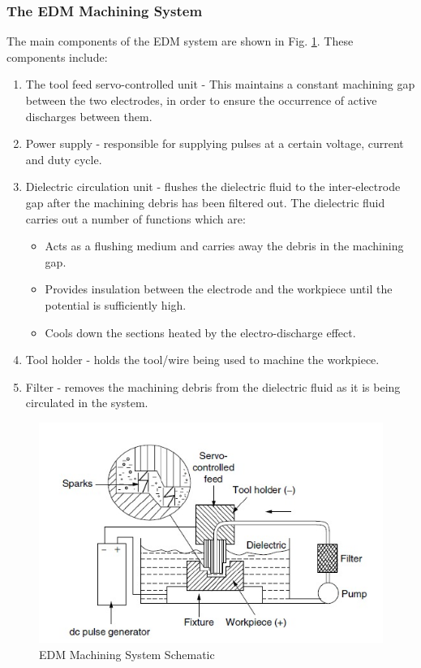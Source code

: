 \subsubsection{The EDM Machining System}
The main components of the EDM system are shown in Fig. \ref{fig:edm}. These components include:
\begin{enumerate}
	\item The tool feed servo-controlled unit - This maintains a constant machining gap between the two electrodes, in order to ensure the occurrence of active discharges between them.
	\item Power supply - responsible for  supplying pulses at a certain voltage, current and duty cycle.
	\item Dielectric circulation unit - flushes the dielectric fluid to the inter-electrode gap after the machining debris has been filtered out. The dielectric fluid carries out a number of functions which are:
	\begin{itemize}
		\item Acts as a flushing medium and carries away the debris in the machining gap.
		\item Provides insulation between the electrode and the workpiece until the potential is sufficiently high.
		\item Cools down the sections heated by the electro-discharge effect.
	\end{itemize}
	\item Tool holder - holds the tool/wire being used to machine the workpiece.
	\item Filter - removes the machining debris from the dielectric fluid as it is being circulated in the system.
\end{enumerate}
\begin{figure}[h!]
	\centering
	\includegraphics[width=0.7\linewidth]{Figures/edm}
	\caption[EDM Machining System]{EDM Machining System Schematic\cite{classnotes}}
	\label{fig:edm}
\end{figure}
